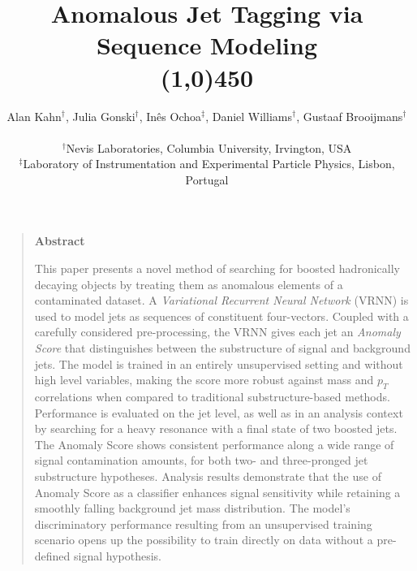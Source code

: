 \documentclass[12pt, a4paper]{article}
\title{\bf{Anomalous Jet Tagging via Sequence Modeling}\\\line(1,0){450}}
\author
{Alan Kahn$^{\dagger}$, Julia Gonski$^{\dagger}$, In\^{e}s Ochoa$^{\ddagger}$, Daniel Williams$^{\dagger}$, Gustaaf Brooijmans$^{\dagger}$\\
\\
\normalsize{$^{\dagger}$Nevis Laboratories, Columbia University, Irvington, USA}\\
\normalsize{$^{\ddagger}$Laboratory of Instrumentation and Experimental Particle Physics, Lisbon, Portugal}
}
\date{}
\newenvironment{sciabstract}{%
\begin{quote}}
{\end{quote}}
\begin{document}
 



\baselineskip16pt

\maketitle 

\setlength{\abovedisplayskip}{5pt}
\setlength{\belowdisplayskip}{5pt}
\setlength{\abovedisplayshortskip}{0pt}
\setlength{\belowdisplayshortskip}{0pt}



\begin{sciabstract}
  \begin{center}
  {\large\bf{Abstract}\\}
  \end{center}
  
  \vspace{0.4cm}

This paper presents a novel method of searching for boosted hadronically
  decaying objects by treating them as anomalous elements of
  a contaminated dataset.  
 A \textit{Variational Recurrent Neural Network} (VRNN) is used to model jets as sequences of constituent four-vectors. 
Coupled with a carefully considered pre-processing, the VRNN gives each jet an \textit{Anomaly Score} that distinguishes between the substructure of signal and background jets.
The model is trained in an entirely unsupervised setting and without high level variables, making the score more robust against mass and $p_{T}$ correlations when compared to traditional substructure-based methods. 
Performance is evaluated on the jet level, as well as in an analysis context by searching for a heavy resonance with a final state of two boosted jets. 
The Anomaly Score shows consistent performance along a wide range of signal contamination amounts, for both two- and three-pronged jet substructure hypotheses. 
Analysis results demonstrate that the use of Anomaly Score as a classifier enhances signal sensitivity while retaining a smoothly falling background jet mass distribution. 
The model's discriminatory performance resulting from an unsupervised training scenario opens up the possibility to train directly on data without a pre-defined signal hypothesis.

    
  
\end{sciabstract}


\clearpage
\end{document}
